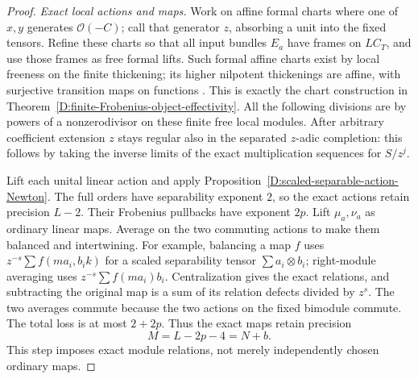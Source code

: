 \begin{proof}
\emph{Exact local actions and maps.}
Work on affine formal charts where one of $x,y$ generates
$\mathcal O(-C)$; call that generator $z$, absorbing a
unit into the fixed tensors. Refine these charts so that
all input bundles $E_a$ have frames on $LC_T$, and use
those frames as free formal lifts. Such formal affine
charts exist by local freeness on the finite thickening;
its higher nilpotent thickenings are affine, with surjective
transition maps on functions
\citep[Lemma 37.2.3, Tag 06AD]{C_StacksFiniteObjectAffineness}.
This is exactly the chart construction in
Theorem~\ref{D:finite-Frobenius-object-effectivity}.
All the following divisions are by powers of a
nonzerodivisor on these finite free local modules.
After arbitrary coefficient extension $z$ stays regular
also in the separated $z$-adic completion: this follows
by taking the inverse limits of the exact multiplication
sequences for $S/z^j$.

Lift each unital linear action and apply
Proposition~\ref{D:scaled-separable-action-Newton}.
The full orders have separability exponent $2$, so the
exact actions retain precision $L-2$. Their Frobenius
pullbacks have exponent $2p$.
Lift $\mu_a,\nu_a$ as ordinary linear maps. Average on
the two commuting actions to make them balanced and
intertwining. For example, balancing a map $f$ uses
$z^{-s}\sum f(ma_i,b_i k)$ for a scaled separability
tensor $\sum a_i\otimes b_i$; right-module averaging
uses $z^{-s}\sum f(ma_i)b_i$. Centralization gives the
exact relations, and subtracting the original map is
a sum of its relation defects divided by $z^s$.
The two averages commute because the two actions on
the fixed bimodule commute. The total loss is at most
$2+2p$. Thus the exact maps retain precision
\[
                         M=L-2p-4=N+b.                \tag{D.MF.7}
\]
This step imposes exact module relations, not merely
independently chosen ordinary maps.


\end{proof}
